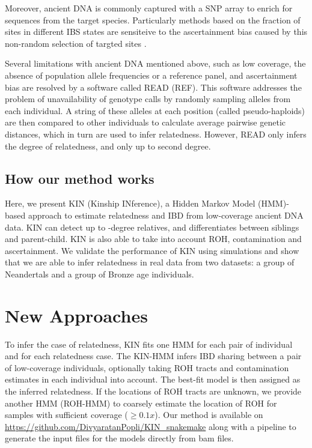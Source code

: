 \documentclass[12pt, letterpaper]{article}
\begin{document}
Moreover, ancient DNA is commonly captured with a SNP array to enrich for sequences from the target species. Particularly methods based  on the fraction of sites in different IBS states are sensiteive to the ascertainment bias caused by this non-random selection of targted sites \cite{waples_allele_2019}. 

Several limitations with ancient DNA mentioned above, such as low coverage, the absence of population allele frequencies or a reference panel, and ascertainment bias are resolved by a software called READ (REF). This software addresses the problem of unavailability of genotype calls by randomly sampling alleles from each individual. A string of these alleles at each position (called pseudo-haploids) are then compared to other individuals to calculate average pairwise genetic distances, which in turn are used to infer relatedness. However, READ only infers the degree of relatedness, and only up to second degree.

\subsection{How our method works}
Here, we present KIN (Kinship INference), a Hidden Markov Model (HMM)-based approach to estimate relatedness and IBD from low-coverage ancient DNA data. KIN can detect up to -degree relatives, and differentiates between siblings and parent-child. KIN is also able to take into account ROH, contamination and ascertainment. We validate the performance of KIN using simulations and show that we are able to infer relatedness in real data from two datasets: a group of Neandertals and a group of Bronze age individuals.


\section{New Approaches}\label{new_approaches}

To infer the case of relatedness, KIN fits one HMM for each pair of individual and for each relatedness case. The KIN-HMM infers IBD sharing between a pair of low-coverage individuals, optionally taking ROH tracts and contamination estimates in each individual into account. The best-fit model is then assigned as the inferred relatedness. If the locations of ROH tracts are unknown, we provide another HMM (ROH-HMM) to coarsely estimate the location of ROH for samples with sufficient coverage ($\geq 0.1x$). Our method is available on \url{https://github.com/DivyaratanPopli/KIN_snakemake} along with a  \cite{koster_snakemakescalable_2012} pipeline to generate the input files for the models directly from bam files. 
\end{document}
